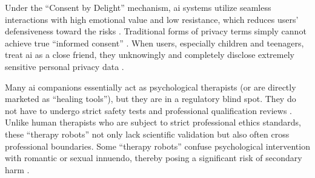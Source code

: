 Under the ``Consent by Delight'' mechanism, \gls{ai} systems utilize seamless interactions with high emotional value and low resistance, which reduces users' defensiveness toward the risks \cite[p.~1, 5]{lee_consent_2025}. Traditional forms of privacy terms simply cannot achieve true ``informed consent'' \cite[p.~2]{lee_consent_2025}. When users, especially children and teenagers, treat \gls{ai} as a close friend, they unknowingly and completely disclose extremely sensitive personal privacy data \cite[p.~6]{kurian_no_2025} \cite[p.~4]{kurian_designing_2025}.


Many \gls{ai} companions essentially act as psychological therapists (or are directly marketed as ``healing tools''), but they are in a regulatory blind spot. They do not have to undergo strict safety tests and professional qualification reviews \cite[p.~82]{branch_ai_2025}. Unlike human therapists who are subject to strict professional ethics standards, these ``therapy robots'' not only lack scientific validation but also often cross professional boundaries. Some ``therapy robots'' confuse psychological intervention with romantic or sexual innuendo, thereby posing a significant risk of secondary harm \cite[p.~50]{huntington_ai_2025}.


